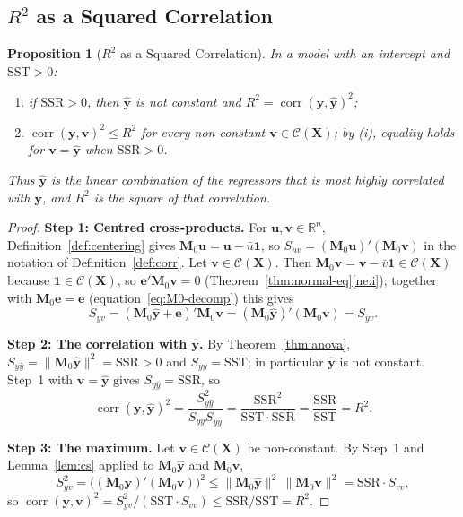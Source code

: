 \documentclass[14pt]{extarticle}
\theoremstyle{plain}
\newtheorem{proposition}[theorem]{Proposition}
\theoremstyle{definition}
\theoremstyle{remark}
\DeclareMathOperator\corr{corr}
\newcommand{\SST}{\mathrm{SST}}
\newcommand{\SSR}{\mathrm{SSR}}
\newcommand{\bX}{\mathbf{X}}
\newcommand{\by}{\mathbf{y}}
\newcommand{\bM}{\mathbf{M}}
\newcommand{\bone}{\mathbf{1}}
\newcommand{\bv}{\mathbf{v}}
\newcommand{\Real}{\mathbb{R}}
\newcommand{\calC}{\mathcal{C}}
\newcommand{\bu}{\mathbf{u}}
\begin{document}
\subsection{\texorpdfstring{$R^2$}{R2} as a Squared Correlation}

\begin{proposition}[$R^2$ as a Squared Correlation]\label{prop:R2-corr}
In a model with an intercept and $\SST > 0$:
\begin{enumerate}[label=\textup{(\roman*)}]
\item if $\SSR > 0$, then $\hat{\by}$ is not constant and $R^2 = \corr(\by, \hat{\by})^2$;
\item $\corr(\by, \bv)^2 \leqslant R^2$ for every non-constant $\bv \in \calC(\bX)$; by (i), equality holds for $\bv = \hat{\by}$ when $\SSR > 0$.
\end{enumerate}
Thus $\hat{\by}$ is the linear combination of the regressors that is most highly correlated with $\by$, and $R^2$ is the square of that correlation.
\end{proposition}

\begin{proof}
\textbf{Step 1: Centred cross-products.} For $\bu, \bv \in \Real^n$, Definition~\ref{def:centering} gives $\bM_0\bu = \bu - \bar u\bone$, so $S_{uv} = (\bM_0\bu)'(\bM_0\bv)$ in the notation of Definition~\ref{def:corr}. Let $\bv \in \calC(\bX)$. Then $\bM_0\bv = \bv - \bar v\bone \in \calC(\bX)$ because $\bone \in \calC(\bX)$, so $\mathbf{e}'\bM_0\bv = 0$ (Theorem~\ref{thm:normal-eq}\ref{ne:i}); together with $\bM_0\mathbf{e} = \mathbf{e}$ (equation~\eqref{eq:M0-decomp}) this gives
\[
S_{yv} = (\bM_0\hat{\by} + \mathbf{e})'\bM_0\bv = (\bM_0\hat{\by})'(\bM_0\bv) = S_{\hat y v}.
\]

\textbf{Step 2: The correlation with $\hat{\by}$.} By Theorem~\ref{thm:anova}, $S_{\hat y\hat y} = \|\bM_0\hat{\by}\|^2 = \SSR > 0$ and $S_{yy} = \SST$; in particular $\hat{\by}$ is not constant. Step~1 with $\bv = \hat{\by}$ gives $S_{y\hat y} = \SSR$, so
\[
\corr(\by, \hat{\by})^2 = \frac{S_{y\hat y}^2}{S_{yy}S_{\hat y\hat y}} = \frac{\SSR^2}{\SST\cdot\SSR} = \frac{\SSR}{\SST} = R^2.
\]

\textbf{Step 3: The maximum.} Let $\bv \in \calC(\bX)$ be non-constant. By Step~1 and Lemma~\ref{lem:cs} applied to $\bM_0\hat{\by}$ and $\bM_0\bv$,
\[
S_{yv}^2 = \bigl((\bM_0\hat{\by})'(\bM_0\bv)\bigr)^2 \leqslant \|\bM_0\hat{\by}\|^2\,\|\bM_0\bv\|^2 = \SSR\cdot S_{vv},
\]
so $\corr(\by, \bv)^2 = S_{yv}^2/(\SST\cdot S_{vv}) \leqslant \SSR/\SST = R^2$.
\end{proof}
\end{document}
